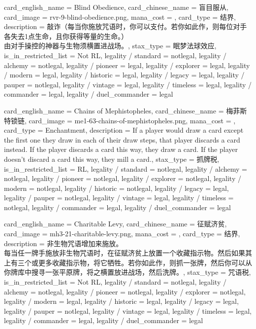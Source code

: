 \documentclass[lang = cn, color = black, 10pt]{AllThatStax}
\begin{document}
\card
{
	card_english_name = {Blind Obedience},
	card_chinese_name = {盲目服从},
	card_image = rvr-9-blind-obedience.png,
	mana_cost = ,
	card_type = 结界,
	description = {敲诈（每当你施放咒语时，你可以支付。若你如此作，则每位对手各失去1点生命，且你获得等量的生命。）\\
		由对手操控的神器与生物须横置进战场。},
	stax_type = 眠梦法球效应,
	is_in_restricted_list = Not RL,
	legality / standard = notlegal,
	legality / alchemy = notlegal,
	legality / pioneer = legal,
	legality / explorer = legal,
	legality / modern = legal,
	legality / historic = legal,
	legality / legacy = legal,
	legality / pauper = notlegal,
	legality / vintage = legal,
	legality / timeless = legal,
	legality / commander = legal,
	legality / duel_commander = legal
}

\card
{
	card_english_name = {Chains of Mephistopheles},
	card_chinese_name = {梅菲斯特锁链},
	card_image = me1-63-chains-of-mephistopheles.png,
	mana_cost = ,
	card_type = Enchantment,
	description = {If a player would draw a card except the first one they draw in each of their draw steps, that player discards a card instead. If the player discards a card this way, they draw a card. If the player doesn't discard a card this way, they mill a card.},
	stax_type = 抓牌税,
	is_in_restricted_list = RL,
	legality / standard = notlegal,
	legality / alchemy = notlegal,
	legality / pioneer = notlegal,
	legality / explorer = notlegal,
	legality / modern = notlegal,
	legality / historic = notlegal,
	legality / legacy = legal,
	legality / pauper = notlegal,
	legality / vintage = legal,
	legality / timeless = notlegal,
	legality / commander = legal,
	legality / duel_commander = legal
}

\card
{
	card_english_name = {Charitable Levy},
	card_chinese_name = {征赋济贫},
	card_image = mh3-21-charitable-levy.png,
	mana_cost = ,
	card_type = 结界,
	description = {非生物咒语增加来施放。\\
		每当任一牌手施放非生物咒语时，在征赋济贫上放置一个收藏指示物。然后如果其上有三个或更多收藏指示物，将它牺牲。若你如此作，则抓一张牌，然后你可以从你牌库中搜寻一张平原牌，将之横置放进战场，然后洗牌。},
	stax_type = 咒语税,
	is_in_restricted_list = Not RL,
	legality / standard = notlegal,
	legality / alchemy = notlegal,
	legality / pioneer = notlegal,
	legality / explorer = notlegal,
	legality / modern = legal,
	legality / historic = legal,
	legality / legacy = legal,
	legality / pauper = notlegal,
	legality / vintage = legal,
	legality / timeless = legal,
	legality / commander = legal,
	legality / duel_commander = legal
}
\end{document}
